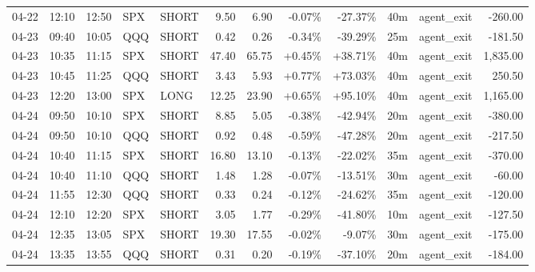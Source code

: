 \documentclass[11pt,a4paper,twoside]{article}
\begin{document}
\begin{center}
\begin{longtable}{>{\color{txtmain}}l l l l l r r r r r >{\color{txtmain}}l r}
04-22 & 12:10 & 12:50 & SPX & SHORT & 9.50 & 6.90 & \textcolor{lossred}{-0.07\%} & \textcolor{lossred}{-27.37\%} & 40m & agent\_exit & \textcolor{lossred}{-260.00} \\
04-23 & 09:40 & 10:05 & QQQ & SHORT & 0.42 & 0.26 & \textcolor{lossred}{-0.34\%} & \textcolor{lossred}{-39.29\%} & 25m & agent\_exit & \textcolor{lossred}{-181.50} \\
04-23 & 10:35 & 11:15 & SPX & SHORT & 47.40 & 65.75 & \textcolor{wingreen}{+0.45\%} & \textcolor{wingreen}{+38.71\%} & 40m & agent\_exit & \textcolor{wingreen}{1,835.00} \\
04-23 & 10:45 & 11:25 & QQQ & SHORT & 3.43 & 5.93 & \textcolor{wingreen}{+0.77\%} & \textcolor{wingreen}{+73.03\%} & 40m & agent\_exit & \textcolor{wingreen}{250.50} \\
04-23 & 12:20 & 13:00 & SPX & LONG & 12.25 & 23.90 & \textcolor{wingreen}{+0.65\%} & \textcolor{wingreen}{+95.10\%} & 40m & agent\_exit & \textcolor{wingreen}{1,165.00} \\
04-24 & 09:50 & 10:10 & SPX & SHORT & 8.85 & 5.05 & \textcolor{lossred}{-0.38\%} & \textcolor{lossred}{-42.94\%} & 20m & agent\_exit & \textcolor{lossred}{-380.00} \\
04-24 & 09:50 & 10:10 & QQQ & SHORT & 0.92 & 0.48 & \textcolor{lossred}{-0.59\%} & \textcolor{lossred}{-47.28\%} & 20m & agent\_exit & \textcolor{lossred}{-217.50} \\
04-24 & 10:40 & 11:15 & SPX & SHORT & 16.80 & 13.10 & \textcolor{lossred}{-0.13\%} & \textcolor{lossred}{-22.02\%} & 35m & agent\_exit & \textcolor{lossred}{-370.00} \\
04-24 & 10:40 & 11:10 & QQQ & SHORT & 1.48 & 1.28 & \textcolor{lossred}{-0.07\%} & \textcolor{lossred}{-13.51\%} & 30m & agent\_exit & \textcolor{lossred}{-60.00} \\
04-24 & 11:55 & 12:30 & QQQ & SHORT & 0.33 & 0.24 & \textcolor{lossred}{-0.12\%} & \textcolor{lossred}{-24.62\%} & 35m & agent\_exit & \textcolor{lossred}{-120.00} \\
04-24 & 12:10 & 12:20 & SPX & SHORT & 3.05 & 1.77 & \textcolor{lossred}{-0.29\%} & \textcolor{lossred}{-41.80\%} & 10m & agent\_exit & \textcolor{lossred}{-127.50} \\
04-24 & 12:35 & 13:05 & SPX & SHORT & 19.30 & 17.55 & \textcolor{lossred}{-0.02\%} & \textcolor{lossred}{-9.07\%} & 30m & agent\_exit & \textcolor{lossred}{-175.00} \\
04-24 & 13:35 & 13:55 & QQQ & SHORT & 0.31 & 0.20 & \textcolor{lossred}{-0.19\%} & \textcolor{lossred}{-37.10\%} & 20m & agent\_exit & \textcolor{lossred}{-184.00} \\

\end{longtable}
\end{center}
\end{document}
